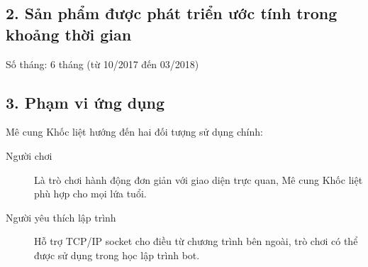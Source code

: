 \documentclass[a4paper,11pt]{article}
\begin{document}
\subsection*{2. Sản phẩm được phát triển ước tính trong khoảng thời gian}
Số tháng: 6 tháng (từ 10/2017 đến 03/2018)

\subsection*{3. Phạm vi ứng dụng}
Mê cung Khốc liệt hướng đến hai đối tượng sử dụng chính:

\begin{description}
  \item[Người chơi] Là trò chơi hành động đơn giản với giao diện trực quan, Mê
    cung Khốc liệt phù hợp cho mọi lứa tuổi.
  \item[Người yêu thích lập trình] Hỗ trợ TCP/IP socket cho điều từ chương
    trình bên ngoài, trò chơi có thể được sử dụng trong học lập trình bot.
\end{description}
\end{document}
